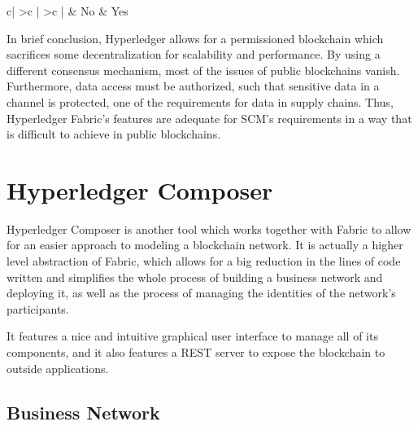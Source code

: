 \begin{table}[]
\begin{tabular}{c|
>{}c |
>{}c |}
              & {\color[HTML]{000000} No}                                                                                                                                                  & {\color[HTML]{000000} Yes}                                                                                                                                                                    \\ \hline
\end{tabular}
\caption{Comparison between traditional PoW consensus and Hyperledger's BFT consensus mechanism}
\label{table:consensus_comparison}
\end{table}





In brief conclusion, Hyperledger allows for a permissioned blockchain which sacrifices some decentralization for scalability and performance. By using a different consensus mechanism, most of the issues of public blockchains vanish. Furthermore, data access must be authorized, such that sensitive data in a channel is protected, one of the requirements for data in supply chains. Thus, Hyperledger Fabric's features are adequate for SCM's requirements in a way that is difficult to achieve in public blockchains.

\section{Hyperledger Composer}

Hyperledger Composer is another tool which works together with Fabric to allow for an easier approach to modeling a blockchain network. It is actually a higher level abstraction of Fabric, which allows for a big reduction in the lines of code written and simplifies the whole process of building a business network and deploying it, as well as the process of managing the identities of the network's participants. 

It features a nice and intuitive graphical user interface to manage all of its components, and it also features a REST server to expose the blockchain to outside applications.

\subsection{Business Network}

